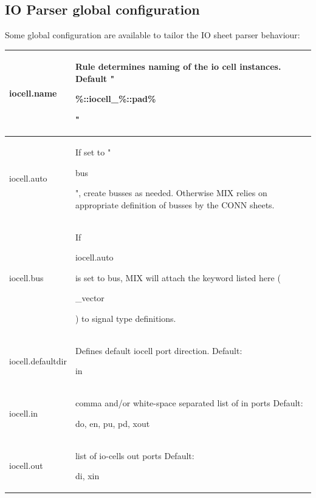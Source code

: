 \documentclass[a4paper,12pt]{article}
\begin{document}
\subsection{IO Parser global configuration}
Some global configuration are available to tailor the IO sheet parser behaviour:\newline
\begin{tabular}{|p{4cm}|p{9cm}|}\hline
\begin{tt}iocell.name\end{tt} & Rule determines naming of the io cell instances. Default "\begin{tt}\%::iocell\_\%::pad\%\end{tt}" \\\hline
\begin{tt}iocell.auto\end{tt} & If set to "\begin{tt}bus\end{tt}", create busses as needed. Otherwise MIX relies on appropriate definition of busses by the CONN sheets. \\\hline
\begin{tt}iocell.bus\end{tt} & If \begin{tt}iocell.auto\end{tt} is set to bus, MIX will attach the keyword listed here (\begin{tt}\_vector\end{tt}) to signal type definitions. \\\hline
\begin{tt}iocell.defaultdir\end{tt} & Defines default iocell port direction. Default: \begin{tt}in\end{tt} \\\hline
\begin{tt}iocell.in\end{tt} & comma and/or white-space separated list of in ports Default: \begin{tt}do, en, pu, pd, xout\end{tt} \\\hline
\begin{tt}iocell.out\end{tt} & list of io-cells out ports Default: \begin{tt}di, xin\end{tt}\\\hline

\end{tabular}
\end{document}
